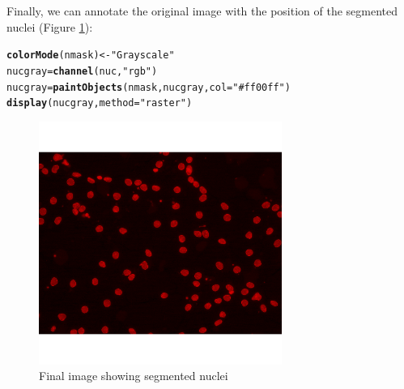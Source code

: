 \documentclass{article}\usepackage[]{graphicx}\usepackage[]{color}
\makeatletter
\newcommand{\hlstr}[1]{\textcolor[rgb]{0.192,0.494,0.8}{#1}}%
\newcommand{\hlstd}[1]{\textcolor[rgb]{0.345,0.345,0.345}{#1}}%
\newcommand{\hlkwb}[1]{\textcolor[rgb]{0.69,0.353,0.396}{#1}}%
\newcommand{\hlkwc}[1]{\textcolor[rgb]{0.333,0.667,0.333}{#1}}%
\newcommand{\hlkwd}[1]{\textcolor[rgb]{0.737,0.353,0.396}{\textbf{#1}}}%
\newenvironment{kframe}{%
 \def\at@end@of@kframe{}%
 \ifinner\ifhmode%
  \def\at@end@of@kframe{\end{minipage}}%
  \begin{minipage}{\columnwidth}%
 \fi\fi%
 \def\FrameCommand##1{\hskip\@totalleftmargin \hskip-\fboxsep
 \colorbox{shadecolor}{##1}\hskip-\fboxsep
     \hskip-\linewidth \hskip-\@totalleftmargin \hskip\columnwidth}%
 \MakeFramed {\advance\hsize-\width
   \@totalleftmargin\z@ \linewidth\hsize
   \@setminipage}}%
 {\par\unskip\endMakeFramed%
 \at@end@of@kframe}
\newenvironment{knitrout}{}{} %
\makeatother
\begin{document}
Finally, we can annotate the original image with the position of the segmented nuclei (Figure \ref{fig:nucgray}):
\begin{knitrout}
\color{fgcolor}\begin{kframe}
\begin{alltt}
\hlkwd{colorMode}\hlstd{(nmask)} \hlkwb{<-} \hlstr{"Grayscale"}
\hlstd{nucgray} \hlkwb{=} \hlkwd{channel}\hlstd{(nuc,} \hlstr{"rgb"}\hlstd{)}
\hlstd{nucgray} \hlkwb{=} \hlkwd{paintObjects}\hlstd{(nmask, nucgray,} \hlkwc{col}\hlstd{=}\hlstr{"#ff00ff"}\hlstd{)}
\hlkwd{display}\hlstd{(nucgray,} \hlkwc{method}\hlstd{=}\hlstr{"raster"}\hlstd{)}
\end{alltt}
\end{kframe}\begin{figure}

{\centering \includegraphics[width=300px]{knit_figure/fignucgray-1} 

}

\caption[Final image showing segmented nuclei]{Final image showing segmented nuclei}\label{fig:nucgray}
\end{figure}


\end{knitrout}
\end{document}
